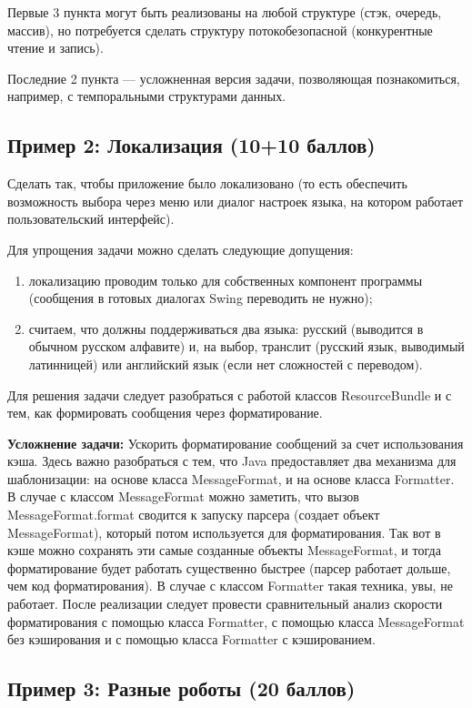 \documentclass[a4paper,12pt]{article}
\begin{document}
Первые 3 пункта могут быть реализованы на любой структуре (стэк, очередь, массив), но потребуется сделать структуру потокобезопасной (конкурентные чтение и запись).

Последние 2 пункта — усложненная версия задачи, позволяющая познакомиться, например, с темпоральными структурами данных.

\subsection{Пример 2: Локализация (10+10 баллов)}

Сделать так, чтобы приложение было локализовано (то есть обеспечить возможность выбора через меню или диалог настроек языка, на котором работает пользовательский интерфейс).

Для упрощения задачи можно сделать следующие допущения:
\begin{enumerate}
    \item локализацию проводим только для собственных компонент программы (сообщения в готовых диалогах Swing переводить не нужно);
    \item считаем, что должны поддерживаться два языка: русский (выводится в обычном русском алфавите) и, на выбор, транслит (русский язык, выводимый латинницей) или английский язык (если нет сложностей с переводом).
\end{enumerate}

Для решения задачи следует разобраться с работой классов ResourceBundle и с тем, как формировать сообщения через форматирование.

\textbf{Усложнение задачи:}
Ускорить форматирование сообщений за счет использования кэша. Здесь важно разобраться с тем, что Java предоставляет два механизма для шаблонизации: на основе класса MessageFormat, и на основе класса Formatter. В случае с классом MessageFormat можно заметить, что вызов MessageFormat.format сводится к запуску парсера (создает объект MessageFormat), который потом используется для форматирования. Так вот в кэше можно сохранять эти самые созданные объекты MessageFormat, и тогда форматирование будет работать существенно быстрее (парсер работает дольше, чем код форматирования). В случае с классом Formatter такая техника, увы, не работает. После реализации следует провести сравнительный анализ скорости форматирования с помощью класса Formatter, с помощью класса MessageFormat без кэширования и с помощью класса Formatter с кэшированием.

\subsection{Пример 3: Разные роботы (20 баллов)}
\end{document}
